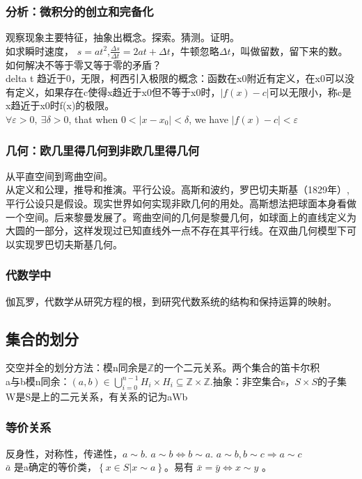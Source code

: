 \documentclass[UTF8]{../09-Mathematics}
\begin{document}
\subsubsection{分析：微积分的创立和完备化}
观察现象主要特征，抽象出概念。探索。猜测。证明。\\
如求瞬时速度， $s=at^2$,$\frac{\Delta s}{\Delta t}=2at+\Delta t$，牛顿忽略$\Delta t$，叫做留数，留下来的数。\\
如何解决不等于零又等于零的矛盾？\\
delta t 趋近于0，无限，柯西引入极限的概念：函数在x0附近有定义，在x0可以没有定义，如果存在c使得x趋近于x0但不等于x0时，$|f(x)-c|$可以无限小，称c是x趋近于x0时f(x)的极限。\\
$\forall \varepsilon >0,\ \exists \delta >0$, that when $0<|x-x_0|<\delta$, we have $|f(x)-c|<\varepsilon$
\subsubsection{几何：欧几里得几何到非欧几里得几何}
从平直空间到弯曲空间。\\
从定义和公理，推导和推演。平行公设。高斯和波约，罗巴切夫斯基（1829年）,平行公设只是假设。现实世界如何实现非欧几何的用处。高斯想法把球面本身看做一个空间。后来黎曼发展了。弯曲空间的几何是黎曼几何，如球面上的直线定义为大圆的一部分，这样发现过已知直线外一点不存在其平行线。在双曲几何模型下可以实现罗巴切夫斯基几何。\\
\subsubsection{代数学中}
伽瓦罗，代数学从研究方程的根，到研究代数系统的结构和保持运算的映射。

\subsection{集合的划分}
交空并全的划分方法：模n同余是$\mathbb Z$的一个二元关系。两个集合的笛卡尔积\\
a与b模n同余：$(a,b) \in \bigcup _{i=0}^{n-1} H_i \times H_i \subseteq \mathbb Z \times \mathbb Z$.抽象：非空集合s，$S\times S$的子集W是S是上的二元关系，有关系的记为aWb\\

\subsubsection{等价关系}
反身性，对称性，传递性，$a \sim b$. $a \sim b \Leftrightarrow b \sim a$. $a \sim b , b \sim c \Rightarrow a \sim c$\\
$\bar a$ 是a确定的等价类，$\left\{ x \in S |x \sim a \right\}$。易有
$\bar x = \bar y \Leftrightarrow x \sim y$ 。\\
\end{document}
